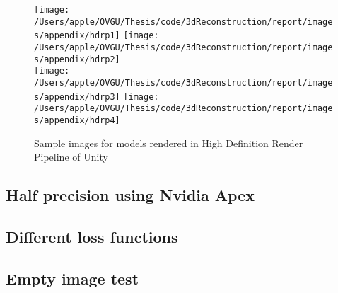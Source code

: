 \begin{figure}[ht]
    \centering
    \texttt{[image: /Users/apple/OVGU/Thesis/code/3dReconstruction/report/images/appendix/hdrp1]}
    \texttt{[image: /Users/apple/OVGU/Thesis/code/3dReconstruction/report/images/appendix/hdrp2]}\\
    \vspace{0.1cm}
    \texttt{[image: /Users/apple/OVGU/Thesis/code/3dReconstruction/report/images/appendix/hdrp3]}
    \texttt{[image: /Users/apple/OVGU/Thesis/code/3dReconstruction/report/images/appendix/hdrp4]}\\
    \caption{Sample images for models rendered in High Definition Render Pipeline of Unity}
    \label{fig:hdrp}
\end{figure}

\subsection{Half precision using Nvidia Apex}

\subsection{Different loss functions}

\subsection{Empty image test}
